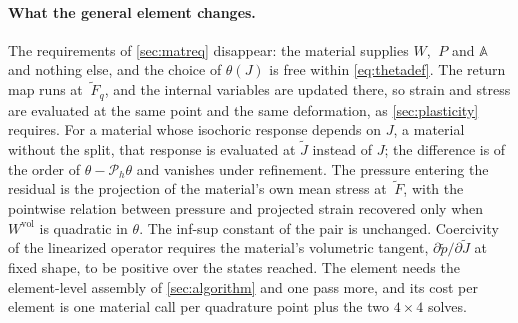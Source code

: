 \documentclass{article}
\newcommand{\F}{~F}
\renewcommand{\P}{~P}
\newcommand{\supvol}{^{\mathrm{vol}}}
\theoremstyle{definition}
\theoremstyle{plain}
\begin{document}
\paragraph{What the general element changes.} The requirements of
\cref{sec:matreq} disappear: the material supplies $W$, $\P$ and
$\mathbb{A}$ and nothing else, and the choice of $\theta(J)$ is free
within \eqref{eq:thetadef}. The return map runs at $\tilde{\F}_q$, and
the internal variables are updated there, so strain and stress are
evaluated at the same point and the same deformation, as
\cref{sec:plasticity} requires. For a material whose isochoric response
depends on $J$, a material without the split, that response is evaluated
at $\tilde J$ instead of $J$; the difference is of the order of $\theta -
\mathcal{P}_h\theta$ and vanishes under refinement. The pressure entering
the residual is the projection of the material's own mean stress at
$\tilde{\F}$, with the pointwise relation between pressure and projected
strain recovered only when $W\supvol$ is quadratic in $\theta$. The
inf-sup constant of the pair is unchanged. Coercivity of the linearized
operator requires the material's volumetric tangent, $\partial\tilde
p/\partial\tilde J$ at fixed shape, to be positive over the states reached.
The element needs the element-level assembly of \cref{sec:algorithm} and
one pass more, and its cost per element is one material call per
quadrature point plus the two $4 \times 4$ solves.
\end{document}
